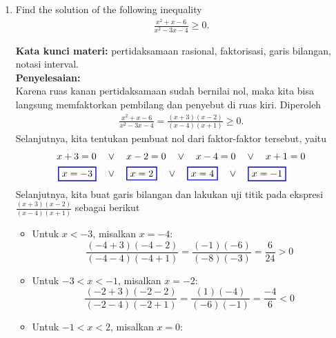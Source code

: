 \documentclass[10pt,openany,a4paper]{article}
\theoremstyle{definition}
\theoremstyle{definition}
\theoremstyle{plain}
\newenvironment{jawab}[2][tes]{%
\par\noindent\textbf{Kata kunci materi:} #1.\\
\textbf{Penyelesaian:} #2%
}{}
\begin{document}
\newpage

\begin{enumerate}
    \item Find the solution of the following inequality
    \begin{align*}
        \frac{x^2+x-6}{x^2-3x-4}\geq 0.
    \end{align*}
    \begin{jawab}[pertidaksamaan rasional, faktorisasi, garis bilangan, notasi interval]{~\\
    Karena ruas kanan pertidaksamaan sudah bernilai nol, maka kita bisa langsung memfaktorkan pembilang dan penyebut di ruas kiri. Diperoleh
    \begin{align*}
        \frac{x^2+x-6}{x^2-3x-4} = \frac{(x+3)(x-2)}{(x-4)(x+1)} \geq 0.
    \end{align*}
    Selanjutnya, kita tentukan pembuat nol dari faktor-faktor tersebut, yaitu
    \begin{align*}
        x+3 = 0 \quad &\vee\quad x-2 = 0 \quad \vee\quad x-4 = 0 \quad \vee\quad x+1 = 0\\
        \colorlet{oldcolor}{.}
        \color{blue}
        \setlength{\fboxrule}{1pt} \boxed{\color{oldcolor}x=-3}\color{oldcolor} \quad &\vee\quad \colorlet{oldcolor}{.}
        \color{blue}
        \setlength{\fboxrule}{1pt} \boxed{\color{oldcolor}x=2}\color{oldcolor} \quad \vee\quad \colorlet{oldcolor}{.}
        \color{blue}
        \setlength{\fboxrule}{1pt} \boxed{\color{oldcolor}x=4}\color{oldcolor} \quad \vee\quad \colorlet{oldcolor}{.}
        \color{blue}
        \setlength{\fboxrule}{1pt} \boxed{\color{oldcolor}x=-1}\color{oldcolor}
    \end{align*}
    Selanjutnya, kita buat garis bilangan dan lakukan uji titik pada ekspresi \(\frac{(x+3)(x-2)}{(x-4)(x+1)}\) sebagai berikut
    \begin{itemize}
        \item Untuk \(x < -3\), misalkan \(x = -4\):
        \[
        \frac{(-4+3)(-4-2)}{(-4-4)(-4+1)} = \frac{(-1)(-6)}{(-8)(-3)} = \frac{6}{24} > 0
        \]
        \item Untuk \(-3 < x < -1\), misalkan \(x = -2\):
        \[
        \frac{(-2+3)(-2-2)}{(-2-4)(-2+1)} = \frac{(1)(-4)}{(-6)(-1)} = \frac{-4}{6} < 0
        \]
        \item Untuk \(-1 < x < 2\), misalkan \(x = 0\):

\end{itemize}}
\end{jawab}
\end{enumerate}
\end{document}
